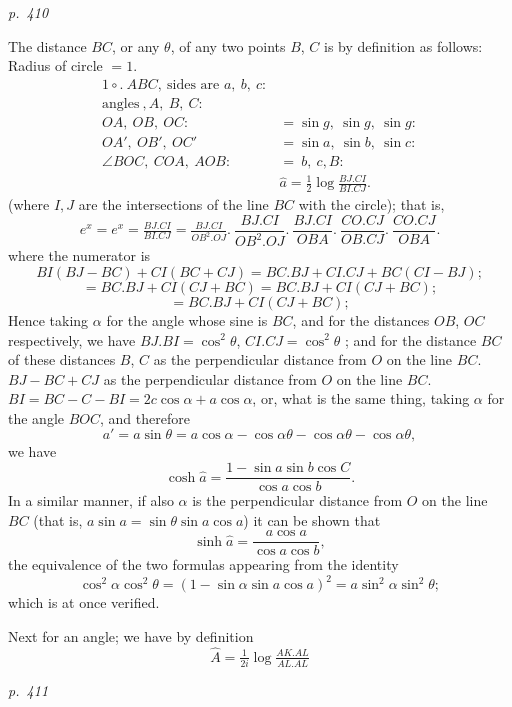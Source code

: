 \documentclass[11pt,a4paper]{article}
\theoremstyle{plain}
\theoremstyle{definition}
\begin{document}
\clearpage

\bigskip
\textit{p.~410}
\smallskip

\noindent
The distance $BC$, or any $\theta$, of any two points $B$, $C$ is by definition as follows:
Radius of circle $= 1$.
\begin{align*}
\mathrm{1\circ}.\ ABC,\ \text{sides are } a,\ b,\ c: \\
\text{angles}\ ,A,\ B,\ C: \\
OA,\ OB,\ OC: &= \sin g,\ \sin g,\ \sin g: \\
OA',\ OB',\ OC' &= \sin a,\ \sin b,\ \sin c: \\
\angle BOC,\ COA,\ AOB: &=\ b,\ c, B: \\
&\hat{a} = \tfrac{1}{2} \log \tfrac{BJ.CI}{BI.CJ}.
\end{align*}
(where $I, J$ are the intersections of the line $BC$ with the circle); that is,
\[
e^x = e^x = \tfrac{BJ.CI}{BI.CJ} = \tfrac{BJ.CI}{OB^2.OJ}.\ \frac{BJ.CI}{OB^2.OJ}.\ \frac{BJ.CI}{OBA}.\ \frac{CO.CJ}{OB.CJ}.\ \frac{CO.CJ}{OBA}.
\]
where the numerator is
\[
BI(BJ - BC) + CI(BC + CJ) = BC.BJ + CI.CJ + BC(CI - BJ);
\]
\[
= BC.BJ + CI(CJ + BC) = BC.BJ + CI(CJ + BC);
\]
\[
= BC.BJ + CI(CJ + BC);
\]
Hence taking $\alpha$ for the angle whose sine is $BC$, and for the distances $OB$, $OC$ respectively,
we have $BJ.BI = \cos^2 \theta$, $CI.CJ = \cos^2 \theta$ ; and for the distance $BC$ of these distances $B$, $C$ as the perpendicular distance from $O$ on the line $BC$.
$BJ - BC + CJ$ as the perpendicular distance from $O$ on the line $BC$.
$BI = BC - C - BI = 2c \cos \alpha + a \cos \alpha$,
or, what is the same thing, taking $\alpha$ for the angle $BOC$, and therefore
\[
a' = a \sin \theta = a \cos \alpha - \cos \alpha \theta - \cos \alpha \theta - \cos \alpha \theta,
\]
we have
\[
\cosh \hat{a} = \frac{1 - \sin a \sin b \cos C}{\cos a \cos b}.
\]
In a similar manner, if also $\alpha$ is the perpendicular distance from $O$ on the line $BC$
(that is, $a \sin a = \sin \theta \sin a \cos a$) it can be shown that
\[
\sinh \hat{a} = \frac{a \cos a}{\cos a \cos b},
\]
the equivalence of the two formulas appearing from the identity
\[
\cos^2\alpha \cos^2 \theta = (1 - \sin \alpha \sin a \cos a)^2 = a \sin^2 \alpha \sin^2 \theta;
\]
which is at once verified.

Next for an angle; we have by definition
\[
\hat{A} = \tfrac{1}{2 i} \log \tfrac{AK. AL}{AL.AL}
\]

\clearpage

\bigskip
\textit{p.~411}
\smallskip
\end{document}
